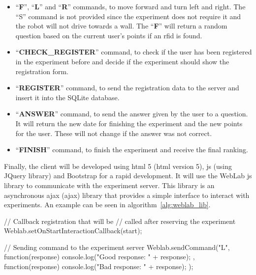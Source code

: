 \begin{itemize}
	\item ``\textbf{F}'', ``\textbf{L}'' and ``\textbf{R}'' commands, to move forward and turn left
	and right. The ``S'' command is not provided since the experiment does not require it and the
	robot will not drive towards a wall. The ``\textbf{F}'' will return a random question based on
	the current user's points if an \acrshort{rfid} is found.

	\item ``\textbf{CHECK\_REGISTER}'' command, to check if the user has been registered in the
	experiment before and decide if the experiment should show the registration form.

	\item ``\textbf{REGISTER}'' command, to send the registration data to the server and insert it
	into the SQLite database.

	\item ``\textbf{ANSWER}'' command, to send the answer given by the user to a question. It will
	return the new date for finishing the experiment and the new points for the user. These will not
	change if the answer was not correct.

	\item ``\textbf{FINISH}'' command, to finish the experiment and receive the final ranking.
\end{itemize}

Finally, the client will be developed using \acrshort{html} 5 (\acrlong{html} version 5),
\acrlong{js} (using JQuery library) and Bootstrap for a rapid development. It will use the WebLab
\acrlong{js} library to communicate with the experiment server. This library is an asynchronous
\acrshort{ajax} (\acrlong{ajax}) library that provides a simple interface to interact with
experiments. An example can be seen in algorithm~\ref{alg:weblab_lib}.

\begin{center}
\begin{minipage}{.9\textwidth}
\singlespace
{}
\begin{pyglist}[language=javascript, caption={WebLab \acrlong{js} library example.},
	label={alg:weblab_lib}, listingname={Algorithm}, numbers=left]
// Callback registration that will be
// called after reserving the experiment
Weblab.setOnStartInteractionCallback(start);

// Sending command to the experiment server
Weblab.sendCommand("L", function(response) {
    console.log("Good response: " + response);
}, function(response) {
    console.log("Bad response: " + response);
});
\end{pyglist}
\end{minipage}
\end{center}

